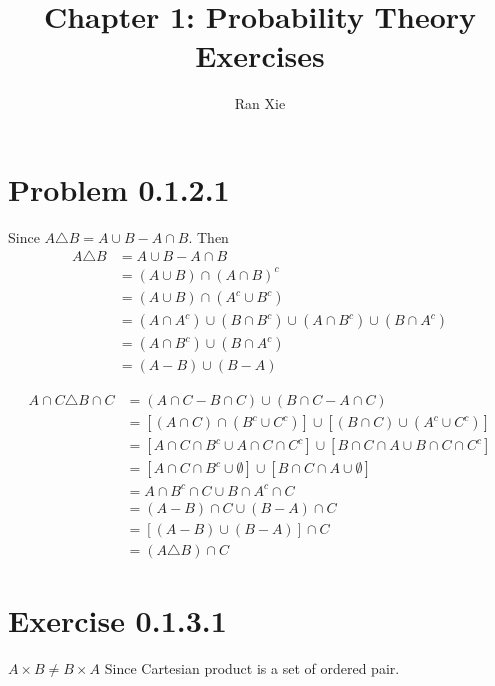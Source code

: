 \documentclass[12pt]{article}
\title{Chapter 1: Probability Theory Exercises}
\author{Ran Xie}
\begin{document}
\maketitle
	
\section*{Problem 0.1.2.1}
Since $A \triangle B = A \cup B - A \cap B$. Then 
$$ \begin{aligned}
	A \triangle B &= A \cup B - A \cap B \\
	&= (A \cup B) \cap (A \cap B)^c \\
	&= (A \cup B) \cap (A^c \cup B^c) \\
	&= (A \cap A^c) \cup (B \cap B^c) \cup (A \cap B^c) \cup (B \cap A^c) \\
	&= (A \cap B^c) \cup (B \cap A^c) \\
	&= (A - B) \cup (B - A)
\end{aligned}
$$

$$ \begin{aligned}
	A \cap C \triangle B \cap C &= (A \cap C - B \cap C) \cup (B \cap C - A \cap C) \\
	&= [(A\cap C) \cap (B^c \cup C^c)] \cup [ (B \cap C) \cup (A^c \cup C^c)] \\
	&= [A \cap C \cap B^c \cup A \cap C \cap C^c ] \cup [ B \cap C \cap A \cup B \cap C \cap C^c] \\
	&= [A \cap C \cap B^c \cup \emptyset ] \cup [ B \cap C \cap A \cup \emptyset] \\
	&=  A \cap B^c \cap C \cup  B \cap A^c \cap C  \\
	&= (A-B)\cap C  \cup (B - A) \cap C \\
	&=  [(A - B) \cup (B-A)] \cap C \\
	&= 	(A \triangle B) \cap C   
\end{aligned}
$$
\section*{Exercise 0.1.3.1}
$A \times B \neq B \times A$ Since Cartesian product is a set of ordered pair. 
\end{document}
